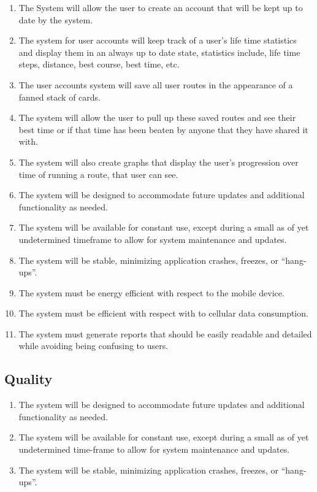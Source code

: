 \documentclass{article}
\begin{document}
\begin{enumerate}
    \item The System will allow the user to create an account that will be kept up to date by the system.
    \item The system for user accounts will keep track of a user's life time statistics and display them in an always up to date state, statistics include, life time steps, distance, best course, best time, etc.
    \item The user accounts system will save all user routes in the appearance of a fanned stack of cards.
    \item The system will allow the user to pull up these saved routes and see their best time or if that time has been beaten by anyone that they have shared it with.
    \item The system will also create graphs that display the user’s progression over time of running a route, that user can see.
    \item The system will be designed to accommodate future updates and additional functionality as needed.
    \item The system will be available for constant use, except during a small as of yet undetermined timeframe to allow for system maintenance and updates.
    \item The system will be stable, minimizing application crashes, freezes, or “hang-ups”.
    \item The system must be energy efficient with respect to the mobile device.
    \item The system must be efficient with respect with to cellular data consumption.
    \item The system must generate reports that should be easily readable and detailed while avoiding being confusing to users.




\end{enumerate}
\subsection{Quality}
\begin{enumerate}
    \item The system will be designed to accommodate future updates and additional functionality as needed.
    \item The system will be available for constant use, except during a small as of yet undetermined time-frame to allow for system maintenance and updates.
    \item The system will be stable, minimizing application crashes, freezes, or “hang-ups”.
\end{enumerate}
\end{document}
